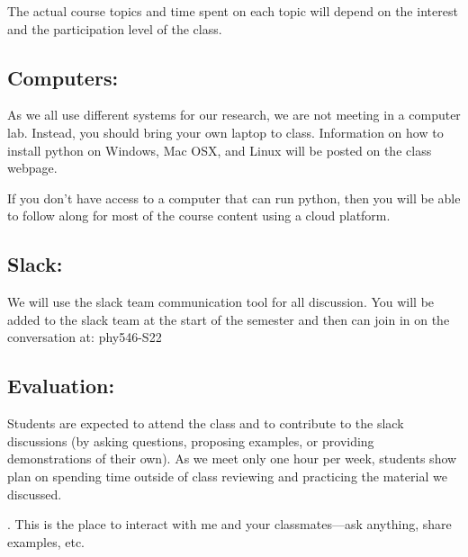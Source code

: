 \documentclass[11pt]{article}
\begin{document}
\noindent The actual course topics and time spent on each topic will depend on the
interest and the participation level of the class.


\subsection*{Computers:}
%
As we all use different systems for our research, we are not meeting
in a computer lab.  Instead, you should bring your own laptop to
class.  Information on how to install python on Windows, Mac OSX, and
Linux will be posted on the class webpage.

\noindent
If you don't have access to a computer that can run python, then you will be
able to follow along for most of the course content using a cloud platform.


\subsection*{Slack:}
%
We will use the slack team communication tool for all discussion.  You
will be added to the slack team at the start of the semester and then
can join in on the conversation at: {\sf phy546-S22}


\subsection*{Evaluation:}

Students are expected to attend the class and to contribute
to the slack discussions (by asking questions, proposing examples, or
providing demonstrations of their own).  As we meet only one hour per
week, students show plan on spending time outside of class reviewing
and practicing the material we discussed.

.  This is the place to interact with
me and your classmates---ask anything, share examples, etc.
\end{document}
